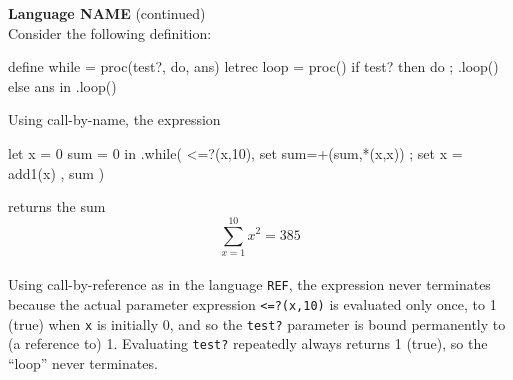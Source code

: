 \begin{minipage}[t]{\sw}
\slidenumber
\LARGE
{\bf Language NAME} (continued)\\[1.5ex]
Consider the following definition:
\Large
\begin{qv}
define while = proc(test?, do, ans)
  letrec loop = proc()
    if test? then {do ; .loop()} else ans
  in .loop()
\end{qv}
\LARGE
Using call-by-name, the expression
\Large
\begin{qv}
let x = 0 sum = 0 in
  .while(
    <=?(x,10),
    { set sum=+(sum,*(x,x)) ; set x = add1(x) },
    sum
  )
\end{qv}
\LARGE
returns the sum
\[\sum_{x=1}^{10} x^2 = 385\]\\
Using call-by-reference as in the language \verb'REF',
the expression never terminates
because the actual parameter expression \verb'<=?(x,10)'
is evaluated only once, to 1 (true) when \verb'x' is initially 0,
and so the \verb'test?' parameter is bound permanently to (a reference to) 1.
Evaluating \verb'test?' repeatedly always returns 1 (true),
so the ``loop'' never terminates.
\end{minipage}
\clearpage

